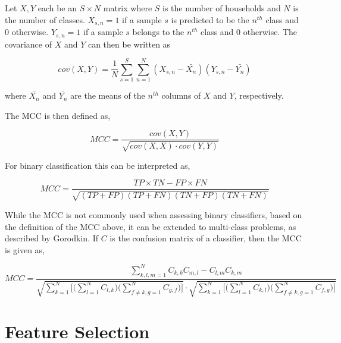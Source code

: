 Let $X,Y$ each be an $S\times N$ matrix where $S$ is the number of households and $N$ is the number of classes. $X_{s,n}=1$ if a sample $s$ is predicted to be the $n^{th}$ class and 0 otherwise. $Y_{s,n}=1$ if a sample $s$ belongs to the $n^{th}$ class and 0 otherwise. The covariance of $X$ and $Y$ can then be written as

\[cov(X,Y)=\frac{1}{N}\sum^S_{s=1}\sum^N_{n=1}(X_{s,n}-\bar{X_n})(Y_{s,n}-\bar{Y_n})\]

where $\bar{X_n}$ and $\bar{Y_n}$ are the means of the $n^{th}$ columns of $X$ and $Y$, respectively.

The MCC is then defined as,

\[MCC=\frac{cov(X,Y)}{\sqrt{cov(X,X)\cdot cov(Y,Y)}}\]


For binary classification this can be interpreted as,

\[MCC=\frac{TP\times TN-FP\times FN}{\sqrt{(TP+FP)(TP+FN)(TN+FP)(TN+FN)}}\]

While the MCC is not commonly used when assessing binary classifiers, based on the definition of the MCC above, it can be extended to multi-class problems, as described by Gorodkin\cite{Gorodkin}. If $C$ is the confusion matrix of a classifier, then the MCC is given as,

\[MCC=\frac{\sum\limits^N_{k,l,m=1}C_{k,k}C_{m,l}-C_{l,m}C_{k,m}}{\sqrt{\sum\limits^N_{k=1}\bigg[\bigg(\sum\limits^N_{l=1}C_{l,k}\bigg)\bigg(\sum\limits^N_{f\ne k,g=1}C_{g,f}\bigg)\bigg]}\cdot \sqrt{\sum\limits^N_{k=1}\bigg[\bigg(\sum\limits^N_{l=1}C_{k,l}\bigg)\bigg(\sum\limits^N_{f\ne k,g=1}C_{f,g}\bigg)\bigg]}}\] 


\section{Feature Selection}

